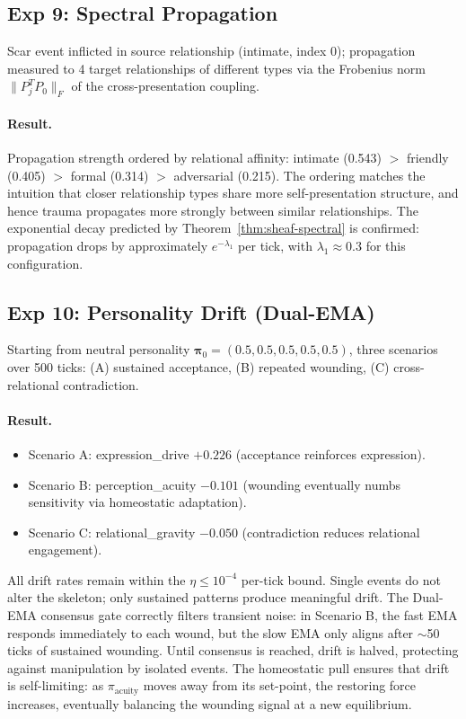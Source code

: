 \documentclass[11pt]{article}
\begin{document}
\subsection{Exp 9: Spectral Propagation}

Scar event inflicted in source relationship (intimate, index 0); propagation measured to 4 target relationships of different types via the Frobenius norm $\|P_j^T P_0\|_F$ of the cross-presentation coupling.

\paragraph{Result.} Propagation strength ordered by relational affinity: intimate (0.543) $>$ friendly (0.405) $>$ formal (0.314) $>$ adversarial (0.215). The ordering matches the intuition that closer relationship types share more self-presentation structure, and hence trauma propagates more strongly between similar relationships. The exponential decay predicted by Theorem~\ref{thm:sheaf-spectral} is confirmed: propagation drops by approximately $e^{-\lambda_1}$ per tick, with $\lambda_1 \approx 0.3$ for this configuration.

\subsection{Exp 10: Personality Drift (Dual-EMA)}

Starting from neutral personality $\boldsymbol{\pi}_0 = (0.5, 0.5, 0.5, 0.5, 0.5)$, three scenarios over 500 ticks: (A) sustained acceptance, (B) repeated wounding, (C) cross-relational contradiction.

\paragraph{Result.}
\begin{itemize}
\item Scenario A: expression\_drive $+0.226$ (acceptance reinforces expression).
\item Scenario B: perception\_acuity $-0.101$ (wounding eventually numbs sensitivity via homeostatic adaptation).
\item Scenario C: relational\_gravity $-0.050$ (contradiction reduces relational engagement).
\end{itemize}
All drift rates remain within the $\eta \leq 10^{-4}$ per-tick bound. Single events do not alter the skeleton; only sustained patterns produce meaningful drift. The Dual-EMA consensus gate correctly filters transient noise: in Scenario B, the fast EMA responds immediately to each wound, but the slow EMA only aligns after $\sim$50 ticks of sustained wounding. Until consensus is reached, drift is halved, protecting against manipulation by isolated events. The homeostatic pull ensures that drift is self-limiting: as $\pi_{\text{acuity}}$ moves away from its set-point, the restoring force increases, eventually balancing the wounding signal at a new equilibrium.
\end{document}
